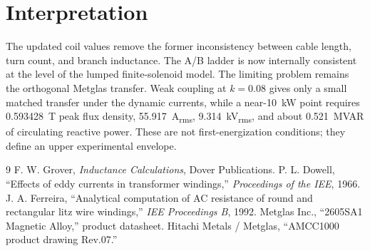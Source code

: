 \documentclass[11pt]{article}
\begin{document}

\section{Interpretation}
The updated coil values remove the former inconsistency between cable length,
turn count, and branch inductance.  The A/B ladder is now internally consistent
at the level of the lumped finite-solenoid model.  The limiting problem remains
the orthogonal Metglas transfer.  Weak coupling at \(k=0.08\) gives only a small
matched transfer under the dynamic currents, while a near-\SI{10}{kW} point
requires \SI{0.593428}{T} peak flux density, \SI{55.917}{A_{rms}},
\SI{9.314}{kV_{rms}}, and about \SI{0.521}{MVAR} of circulating
reactive power.  These are not first-energization conditions; they define an
upper experimental envelope.

\begin{thebibliography}{9}
 F. W. Grover, \emph{Inductance Calculations}, Dover Publications.
 P. L. Dowell, ``Effects of eddy currents in transformer windings,'' \emph{Proceedings of the IEE}, 1966.
 J. A. Ferreira, ``Analytical computation of AC resistance of round and rectangular litz wire windings,'' \emph{IEE Proceedings B}, 1992.
 Metglas Inc., ``2605SA1 Magnetic Alloy,'' product datasheet.
 Hitachi Metals / Metglas, ``AMCC1000 product drawing Rev.07.''
\end{thebibliography}
\end{document}
